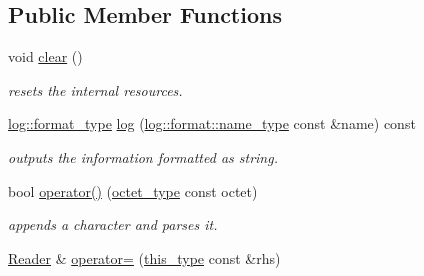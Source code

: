 \subsection*{Public Member Functions}
\begin{DoxyCompactItemize}
\item 
\hypertarget{classhryky_1_1uri_1_1scheme_1_1_reader_a22183b64bccf3b69cf30a891dbc144c0}{void \hyperlink{classhryky_1_1uri_1_1scheme_1_1_reader_a22183b64bccf3b69cf30a891dbc144c0}{clear} ()}\label{classhryky_1_1uri_1_1scheme_1_1_reader_a22183b64bccf3b69cf30a891dbc144c0}

\begin{DoxyCompactList}\small\item\em resets the internal resources. \end{DoxyCompactList}\item 
\hypertarget{classhryky_1_1uri_1_1scheme_1_1_reader_a8caaab2bc2e701f7d85e0fafd3829c60}{\hyperlink{namespacehryky_1_1log_ad50448c3f934f1eacd5c1bcffe8111e1}{log\-::format\-\_\-type} \hyperlink{classhryky_1_1uri_1_1scheme_1_1_reader_a8caaab2bc2e701f7d85e0fafd3829c60}{log} (\hyperlink{namespacehryky_1_1log_1_1format_ab7408d1e2ed2d648dbf9bba69eb74288}{log\-::format\-::name\-\_\-type} const \&name) const }\label{classhryky_1_1uri_1_1scheme_1_1_reader_a8caaab2bc2e701f7d85e0fafd3829c60}

\begin{DoxyCompactList}\small\item\em outputs the information formatted as string. \end{DoxyCompactList}\item 
\hypertarget{classhryky_1_1uri_1_1scheme_1_1_reader_a17fde133e05f4cebfaa80460623e7c28}{bool \hyperlink{classhryky_1_1uri_1_1scheme_1_1_reader_a17fde133e05f4cebfaa80460623e7c28}{operator()} (\hyperlink{namespacehryky_a488cba8b666be33ccca70e819684e3c8}{octet\-\_\-type} const octet)}\label{classhryky_1_1uri_1_1scheme_1_1_reader_a17fde133e05f4cebfaa80460623e7c28}

\begin{DoxyCompactList}\small\item\em appends a character and parses it. \end{DoxyCompactList}\item 
\hypertarget{classhryky_1_1uri_1_1scheme_1_1_reader_a4bb2f0235a71f970721a7427e258587c}{\hyperlink{classhryky_1_1uri_1_1scheme_1_1_reader}{Reader} \& \hyperlink{classhryky_1_1uri_1_1scheme_1_1_reader_a4bb2f0235a71f970721a7427e258587c}{operator=} (\hyperlink{classhryky_1_1uri_1_1scheme_1_1_reader_a06f7352c04d11e56624f3fe26280411f}{this\-\_\-type} const \&rhs)}\label{classhryky_1_1uri_1_1scheme_1_1_reader_a4bb2f0235a71f970721a7427e258587c}


\end{DoxyCompactItemize}
